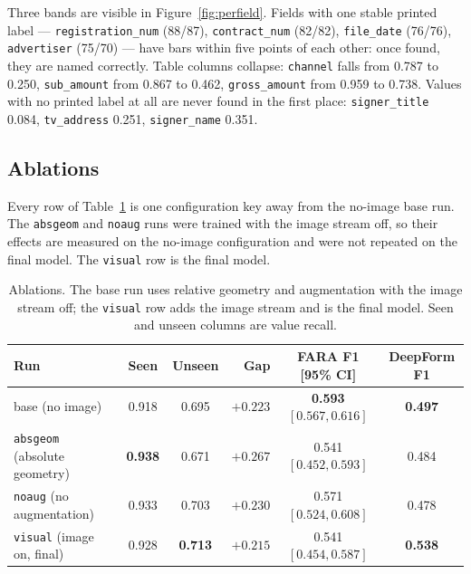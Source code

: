 \documentclass[11pt,a4paper]{article}
\newcommand{\code}[1]{\texttt{\small #1}}
\begin{document}
Three bands are visible in Figure~\ref{fig:perfield}. Fields with one stable printed label ---
\code{registration\_num} (88/87), \code{contract\_num} (82/82), \code{file\_date} (76/76),
\code{advertiser} (75/70) --- have bars within five points of each other: once found, they are
named correctly. Table columns collapse: \code{channel} falls from 0.787 to 0.250,
\code{sub\_amount} from 0.867 to 0.462, \code{gross\_amount} from 0.959 to 0.738. Values with no
printed label at all are never found in the first place: \code{signer\_title} 0.084,
\code{tv\_address} 0.251, \code{signer\_name} 0.351.

\subsection{Ablations}
\label{sec:ablations}

Every row of Table~\ref{tab:ablations} is one configuration key away from the no-image base run.
The \code{absgeom} and \code{noaug} runs were trained with the image stream off, so their effects
are measured on the no-image configuration and were not repeated on the final model. The
\code{visual} row is the final model.

\begin{table}[htbp]
\centering\small
\begin{tabular}{@{}lccrcc@{}}
\toprule
\textbf{Run} & \textbf{Seen} & \textbf{Unseen} & \textbf{Gap} &
\textbf{FARA F1 [95\% CI]} & \textbf{DeepForm F1} \\
\midrule
base (no image)                       & 0.918 & 0.695 & $+0.223$ & \textbf{0.593} $[0.567, 0.616]$ & \textbf{0.497} \\
\code{absgeom} (absolute geometry)    & \textbf{0.938} & 0.671 & $+0.267$ & 0.541 $[0.452, 0.593]$ & 0.484 \\
\code{noaug} (no augmentation)        & 0.933 & 0.703 & $+0.230$ & 0.571 $[0.524, 0.608]$ & 0.478 \\
\code{visual} (image on, final)       & 0.928 & \textbf{0.713} & $\mathbf{+0.215}$ & 0.541 $[0.454, 0.587]$ & \textbf{0.538} \\
\bottomrule
\end{tabular}
\caption{Ablations. The base run uses relative geometry and augmentation with the image stream off; the \code{visual} row adds the image stream and is the final model. Seen and unseen columns are value recall.}
\label{tab:ablations}
\end{table}
\end{document}
